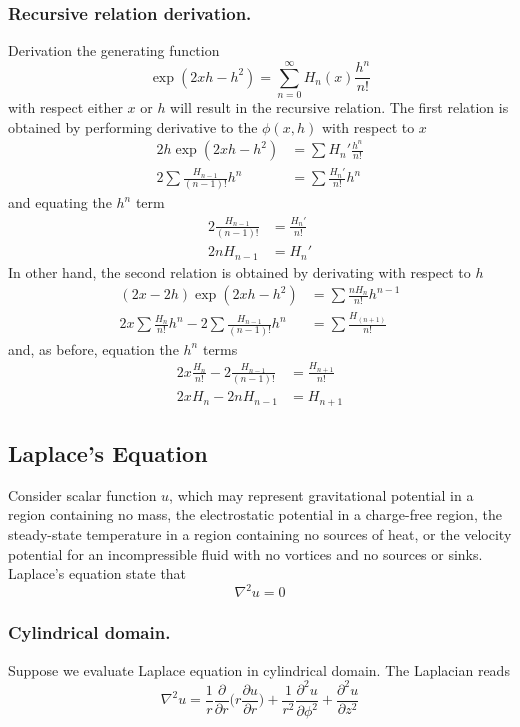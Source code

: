 \documentclass[../main.tex]{subfiles}
\begin{document}
\subsubsection*{Recursive relation derivation.} 
Derivation the generating function
\begin{equation*}
    \exp(2xh-h^2)=\sum_{n=0}^{\infty}H_n(x)\frac{h^n}{n!}
\end{equation*}
with respect either $x$ or $h$ will result in the recursive relation.
The first relation is obtained by performing derivative to the $\phi(x,h)$ with respect to $x$
\begin{align*}
    2h\exp(2xh-h^2)&=\sum H_n'\frac{h^n}{n!}\\
    2\sum\frac{H_{n-1}}{(n-1)!}h^n&=\sum \frac{H_n'}{n!}h^n
\end{align*}
and equating the $h^n$ term 
\begin{align*}
    2\frac{H_{n-1}}{(n-1)!}&=\frac{H_n'}{n!}\\
    2nH_{n-1}&=H_n'
\end{align*}
In other hand, the second relation is obtained by derivating with respect to $h$
\begin{align*}
    (2x-2h)\exp(2xh-h^2)&=\sum\frac{nH_n}{n!}h^{n-1}\\
    2x\sum \frac{H_n}{n!}h^n-2 \sum \frac{H_{n-1}}{(n-1)!}h^n &=\sum \frac{H_(n+1)}{n!}
\end{align*}
and, as before, equation the $h^n$ terms 
\begin{align*}
    2x\frac{H_n}{n!}-2\frac{H_{n-1}}{(n-1)!}&=\frac{H_{n+1}}{n!}\\
    2xH_n-2nH_{n-1}&=H_{n+1}
\end{align*}

\subsection*{Laplace's Equation}
Consider scalar function $u$, which may represent gravitational potential in a region containing no mass, the electrostatic potential in a charge-free region, the steady-state temperature in a region containing no sources of heat, or the velocity potential for an incompressible fluid with no vortices and no sources or sinks.
Laplace's equation state that
\begin{equation*}
    \nabla^2 u=0
\end{equation*}

\subsubsection*{Cylindrical domain.} Suppose we evaluate Laplace equation in cylindrical domain. 
The Laplacian reads
\begin{equation*}
    \nabla^2u= \frac{1}{r}\frac{\partial}{\partial r}\Biggl(r\frac{\partial u}{\partial r}\Biggr)+\frac{1}{r^2} \frac{\partial^2u}{\partial \phi^2}+ \frac{\partial^2u}{\partial z^2}
\end{equation*}
\end{document}
